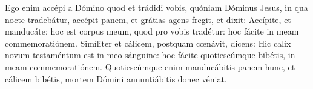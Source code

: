 Ego enim accépi a Dómino quod et trádidi vobis,
	quóniam Dóminus Jesus, in qua nocte tradebátur, accépit panem,
	et grátias agens fregit, et dixit:
	Accípite, et manducáte: hoc est corpus meum, quod pro vobis tradétur:
	hoc fácite in meam commemoratiónem.
Simíliter et cálicem, postquam cœnávit, dicens:
	Hic calix novum testaméntum est in meo sánguine:
	hoc fácite quotiescúmque bibétis, in meam commemoratiónem.
Quotiescúmque enim manducábitis panem hunc, et cálicem bibétis,
	mortem Dómini annuntiábitis donec véniat.
